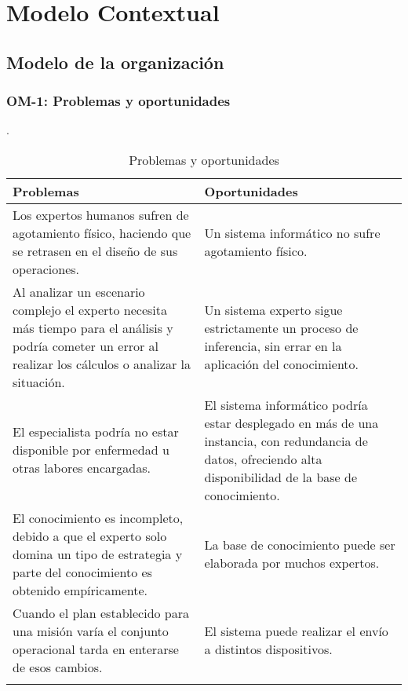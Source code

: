 \chapter{Modelo Contextual}


\section{Modelo de la organización}


\subsection{OM-1: Problemas y oportunidades}
.

\begin{longtable}{p{}|p{}}

\textbf{Problemas} & \textbf{Oportunidades} \\\toprule
\endhead


Los expertos humanos sufren de agotamiento físico, haciendo que se retrasen en el diseño de sus operaciones.
&
Un sistema informático no sufre agotamiento físico.
\\\midrule


Al analizar un escenario complejo el experto necesita más tiempo para el análisis y podría cometer un error al realizar los cálculos o analizar la situación.
&
Un sistema experto sigue estrictamente un proceso de inferencia, sin errar en la aplicación del conocimiento.
\\\midrule


El especialista podría no estar disponible por enfermedad u otras labores encargadas.
&
El sistema informático podría estar desplegado en más de una instancia, con redundancia de datos, ofreciendo alta disponibilidad de la base de conocimiento.
\\\midrule


El conocimiento es incompleto, debido a que el experto solo domina un tipo de estrategia y parte del conocimiento es obtenido empíricamente.
&
La base de conocimiento puede ser elaborada por muchos expertos.
\\\midrule


Cuando el plan establecido para una misión varía el conjunto operacional tarda en enterarse de esos cambios.
&
El sistema puede realizar el envío a distintos dispositivos.
\\\bottomrule

\caption{Problemas y oportunidades}
\label{cuadro:om1problemasyoportunidades}

\end{longtable}
